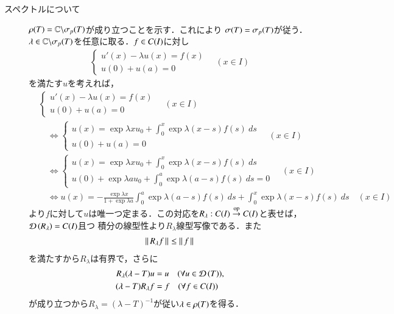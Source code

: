 \begin{prf}
\begin{description}
			\item[スペクトルについて]
				$\mathfrak{\rho} (T) = \mathbb{C} \backslash \mathfrak{\sigma}_p (T) $が成り立つことを示す．これにより
				$\mathfrak{\sigma} (T) = \mathfrak{\sigma}_p (T) $が従う．
				$\lambda \in \mathbb{C} \backslash \mathfrak{\sigma}_p (T) $を任意に取る．$f \in C(I)$に対し
				\begin{align}
					\begin{cases}
						u'(x) - \lambda u(x) = f(x) \\
						u(0) + u(a) = 0
					\end{cases}
					\quad (x \in I)
				\end{align}
				を満たす$u$を考えれば，
				\begin{align}
					&\begin{cases}
						u'(x) - \lambda u(x) = f(x) \\
						u(0) + u(a) = 0
					\end{cases}
					\quad (x \in I) \\
					&\quad \Leftrightarrow 
					\begin{cases}
						u(x) = \exp{\lambda x}u_0 + \int_0^x \exp{\lambda (x-s)} f(s)\ ds \\
						u(0) + u(a) = 0
					\end{cases}
					\quad (x \in I) \\
					&\quad \Leftrightarrow 
					\begin{cases}
						u(x) = \exp{\lambda x}u_0 + \int_0^x \exp{\lambda (x-s)} f(s)\ ds \\
						u(0) + \exp{\lambda a}u_0 + \int_0^a \exp{\lambda (a-s)} f(s)\ ds = 0
					\end{cases}
					\quad (x \in I) \\
					&\quad \Leftrightarrow 
					u(x) = -\frac{\exp{\lambda x}}{1 + \exp{\lambda a}} \int_0^a \exp{\lambda (a-s)} f(s)\ ds + \int_0^x \exp{\lambda (x-s)} f(s)\ ds
					\quad (x \in I)
				\end{align}
				より$f$に対して$u$は唯一つ定まる．この対応を$R_\lambda:C(I) \overset{\mathrm{op}}{\rightarrow} C(I)$と表せば，$\Dom{R_\lambda} = \c{I}$且つ
				積分の線型性より$R_\lambda$線型写像である．また
				\begin{align}
					\left\|\, R_\lambda f\, \right\|_{} \leq \left\|\, f\, \right\|_{}
				\end{align}
				を満たすから$R_\lambda$は有界で，さらに
				\begin{align}
					R_\lambda (\lambda - T) u &= u \quad (\forall u \in \Dom{T} ), \\
					(\lambda - T) R_\lambda f &= f \quad (\forall f \in \c{I})
				\end{align}
				が成り立つから$R_\lambda = (\lambda - T)^{-1}$が従い$\lambda \in \mathfrak{\rho} (T) $を得る．
		\end{description}
	\end{prf}